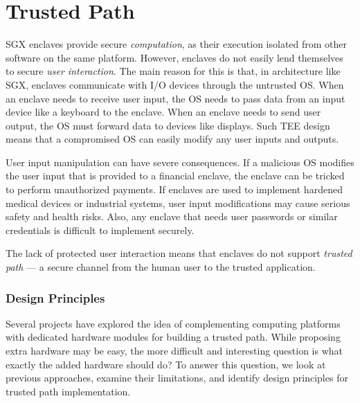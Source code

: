 
\section*{Trusted Path}

SGX enclaves provide secure \emph{computation}, as their execution isolated from other software on the same platform. However, enclaves do not easily lend themselves to secure \emph{user interaction}. The main reason for this is that, in architecture like SGX, enclaves communicate with I/O devices through the untrusted OS. When an enclave needs to receive user input, the OS needs to pass data from an input device like a keyboard to the enclave. When an enclave needs to send user output, the OS must forward data to devices like displays. Such TEE design means that a compromised OS can easily modify any user inputs and outputs.

User input manipulation can have severe consequences. If a malicious OS modifies the user input that is provided to a financial enclave, the enclave can be tricked to perform unauthorized payments. If enclaves are used to implement hardened medical devices or industrial systems, user input modifications may cause serious safety and health risks. Also, any enclave that needs user passwords or similar credentials is difficult to implement securely.

The lack of protected user interaction means that enclaves do not support \emph{trusted path} --- a secure channel from the human user to the trusted application. 



\subsubsection*{Design Principles}

Several projects have explored the idea of complementing computing platforms with dedicated hardware modules for building a trusted path. While proposing extra hardware may be easy, the more difficult and interesting question is what exactly the added hardware should do? To answer this question, we look at previous approaches, examine their limitations, and identify design principles for trusted path implementation.
    

